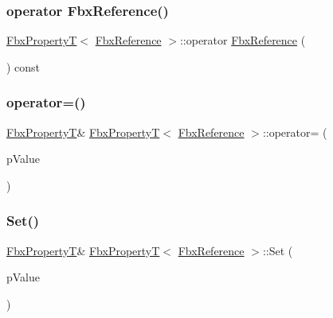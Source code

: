 \subsubsection{\texorpdfstring{operator Fbx\+Reference()}{operator FbxReference()}}
{\footnotesize\ttfamily \hyperlink{class_fbx_property_t}{Fbx\+PropertyT}$<$ \hyperlink{fbxtypes_8h_a44df6a2eec915cf27cd481e5c5e48a24}{Fbx\+Reference} $>$\+::operator \hyperlink{fbxtypes_8h_a44df6a2eec915cf27cd481e5c5e48a24}{Fbx\+Reference} (\begin{DoxyParamCaption}{ }\end{DoxyParamCaption}) const}

\mbox{\label{class_fbx_property_t_3_01_fbx_reference_01_4_a84a5262ef5dc13b09eb598d554949ce7}} 
\subsubsection{\texorpdfstring{operator=()}{operator=()}}
{\footnotesize\ttfamily \hyperlink{class_fbx_property_t}{Fbx\+PropertyT}\& \hyperlink{class_fbx_property_t}{Fbx\+PropertyT}$<$ \hyperlink{fbxtypes_8h_a44df6a2eec915cf27cd481e5c5e48a24}{Fbx\+Reference} $>$\+::operator= (\begin{DoxyParamCaption}\item[{const \hyperlink{fbxtypes_8h_a44df6a2eec915cf27cd481e5c5e48a24}{Fbx\+Reference} \&}]{p\+Value }\end{DoxyParamCaption})}

\mbox{\label{class_fbx_property_t_3_01_fbx_reference_01_4_a7d67d93829ab10066d0f7814a676f3c3}} 
\subsubsection{\texorpdfstring{Set()}{Set()}}
{\footnotesize\ttfamily \hyperlink{class_fbx_property_t}{Fbx\+PropertyT}\& \hyperlink{class_fbx_property_t}{Fbx\+PropertyT}$<$ \hyperlink{fbxtypes_8h_a44df6a2eec915cf27cd481e5c5e48a24}{Fbx\+Reference} $>$\+::Set (\begin{DoxyParamCaption}\item[{const \hyperlink{fbxtypes_8h_a44df6a2eec915cf27cd481e5c5e48a24}{Fbx\+Reference} \&}]{p\+Value }\end{DoxyParamCaption})}

